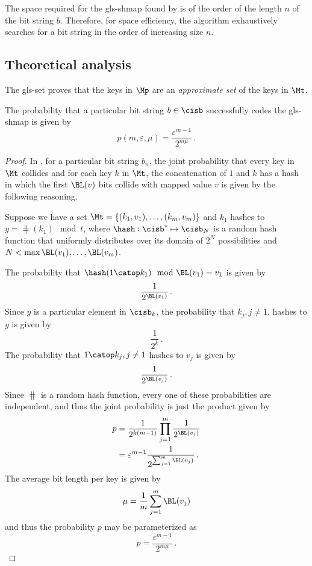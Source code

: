 \documentclass{article}
\begin{document}
The space required for the \gls{gls-shmap} found by  is of the order of the length $n$ of the bit string $b$. Therefore, for space efficiency, the algorithm exhaustively searches for a bit string in the order of increasing size $n$.

\subsection{Theoretical analysis}
The \gls{gls-set} proves that the keys in $\Mp$ are an \emph{approximate set} of the keys in $\Mt$.

\begin{theorem}
The probability that a particular bit string $b \in \cisb$ successfully codes the \gls{gls-shmap} is given by
\begin{equation}
    p(m,\varepsilon,\mu) = \frac{\varepsilon^{m-1}}{2^{m \mu}}\,.
\end{equation}
\end{theorem}
\begin{proof}
In , for a particular bit string $b_n$, the joint probability that every key in $\Mt$ collides and for each key $k$ in $\Mt$, the concatenation of $1$ and $k$ has a hash in which the first $\BL(v)$ bits collide with mapped value $v$ is given by the following reasoning.

Suppose we have a set $\Mt = \{(k_1,v_1),\ldots,(k_m,v_m)\}$ and $k_1$ hashes to $y = \hash(k_1) \mod t$, where $\hash : \cisb^* \mapsto \cisb_N$ is a random hash function that uniformly distributes over its domain of $2^N$ possibilities and $N < \max{\BL(v_1),\ldots,\BL(v_m)}$.

The probability that $\hash(1 \catop k_1) \mod \BL(v_1) = v_1$ is given by
\begin{equation}
    \frac{1}{2^{\BL(v_1)}}\,.
\end{equation}
Since $y$ is a particular element in $\cisb_k$, the probability that $k_j, j \neq 1$, hashes to $y$ is given by
\begin{equation}
    \frac{1}{2^k}\,.
\end{equation}
The probability that $1 \catop k_j, j \neq 1$ hashes to $v_j$ is given by
\begin{equation}
    \frac{1}{2^{\BL(v_j)}}\,.
\end{equation}
Since $\hash$ is a random hash function, every one of these probabilities are independent, and thus the joint probability is just the product given by
\begin{align}
    p &= \frac{1}{2^{k(m-1)}} \prod_{j=1}^{m} \frac{1}{2^{\BL(v_j)}}\\
      &= \varepsilon^{m-1} \frac{1}{2^{\sum_{j=1}^{m} \BL(v_j)}}\,.
\end{align}
The average bit length per key is given by
\begin{equation}
    \mu = \frac{1}{m} \sum_{j=1}^{m} \BL(v_j)
\end{equation}
and thus the probability $p$ may be parameterized as
\begin{equation}
    p = \frac{\varepsilon^{m-1}}{2^{m \mu}}\,.
\end{equation}
\end{proof}
\end{document}
